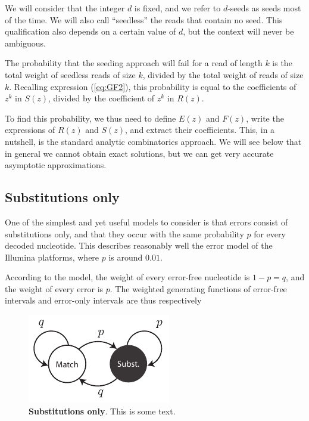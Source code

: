 \documentclass{article}
\begin{document}
We will consider that the integer $d$ is fixed, and we refer to $d$-seeds
as seeds most of the time. We will also call ``seedless'' the reads that
contain no seed. This qualification also depends on a certain value of
$d$, but the context will never be ambiguous.

The probability that the seeding approach will fail for a read of length
$k$ is the total weight of seedless reads of size $k$, divided by the
total weight of reads of size $k$. Recalling expression (\ref{eq:GF2}),
this probability is equal to the coefficients of $z^k$ in $S(z)$, divided
by the coefficient of $z^k$ in $R(z)$.

To find this probability, we thus need to define $E(z)$ and $F(z)$, write
the expressions of $R(z)$ and $S(z)$, and extract their coefficients.
This, in a nutshell, is the standard analytic combinatorics approach. We
will see below that in general we cannot obtain exact solutions, but we
can get very accurate asymptotic approximations.




\subsection{Substitutions only}
\label{sec:substitutions}

One of the simplest and yet useful models to consider is that errors
consist of substitutions only, and that they occur with the same
probability $p$ for every decoded nucleotide. This describes reasonably
well the error model of the Illumina platforms, where $p$ is around
$0.01$.

According to the model, the weight of every error-free nucleotide is $1-p
= q$, and the weight of every error is $p$. The weighted generating
functions of error-free intervals and error-only intervals are thus
respectively

\begin{figure}[h]
\centering
\includegraphics[scale=0.9]{substitutions_only.pdf}
\caption{\textbf{Substitutions only}. 
This is some text.}
\label{fig:subonly}
\end{figure}
\end{document}
